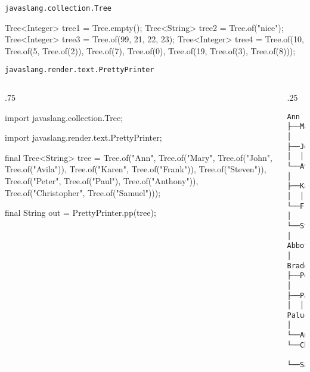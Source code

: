 \documentclass[smaller]{beamer}
\begin{document}
    
\begin{frame}{\texttt{javaslang.collection.Tree}}
\begin{pygmented}[]
Tree<Integer> tree1 = Tree.empty();
Tree<String> tree2 = Tree.of("nice");
Tree<Integer> tree3 = Tree.of(99, 21, 22, 23);
Tree<Integer> tree4 = Tree.of(10,
                              Tree.of(5, Tree.of(2)),
                              Tree.of(7),
                              Tree.of(0),
                              Tree.of(19, Tree.of(3), Tree.of(8)));
\end{pygmented}
    \begin{center}
    \end{center}
\end{frame}


\begin{frame}{\texttt{javaslang.render.text.PrettyPrinter}}
  \small
  \begin{columns}[t]
    \begin{column}{.75\textwidth}
\begin{pygmented}[]
import javaslang.collection.Tree;

import javaslang.render.text.PrettyPrinter;

final Tree<String> tree =
       Tree.of("Ann",
               Tree.of("Mary",
                       Tree.of("John",
                               Tree.of("Avila")),
                       Tree.of("Karen",
                               Tree.of("Frank")),
                       Tree.of("Steven\nAbbot\nBraddock")),
               Tree.of("Peter",
                       Tree.of("Paul\nPalucci"),
                       Tree.of("Anthony")),
               Tree.of("Christopher",
                       Tree.of("Samuel")));

final String out = PrettyPrinter.pp(tree);
\end{pygmented}
    \end{column}
    \begin{column}{.25\textwidth}
\begin{Verbatim}
Ann
├──Mary
│  ├──John
│  │  └──Avila
│  ├──Karen
│  │  └──Frank
│  └──Steven
│     Abbot
│     Braddock
├──Peter
│  ├──Paul
│  │  Palucci
│  └──Anthony
└──Christopher
   └──Samuel
\end{Verbatim}
    \end{column}
  \end{columns}
\end{frame}
\end{document}
